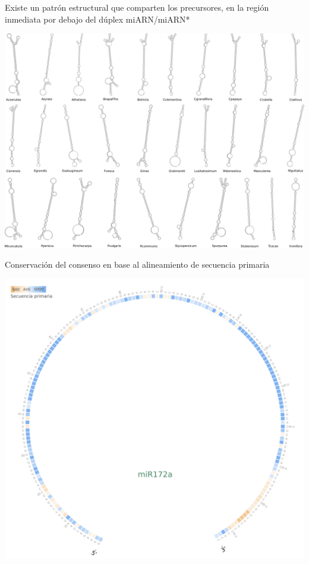 \documentclass{beamer}
\begin{document}
\begin{frame}{Existe un patrón estructural que comparten los precursores, en la región inmediata por debajo del dúplex miARN/miARN*}
	\begin{center}
		\includegraphics[width=.8\textwidth]{img/miR172a_rnafold.png}
	\end{center}
    \begin{center}
    \end{center}
\end{frame}

\begin{frame}{Conservación del consenso en base al alineamiento de secuencia primaria}
	\begin{center}
		\includegraphics[width=.8\textwidth]{img/miR172a_circos01.png}
	\end{center}
\end{frame}
\end{document}
